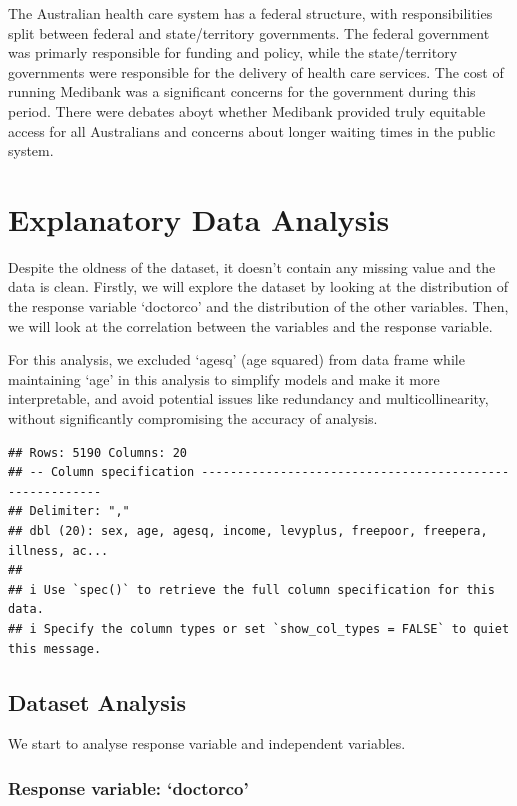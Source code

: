 \documentclass[
]{article}
\begin{document}
The Australian health care system has a federal structure, with
responsibilities split between federal and state/territory governments.
The federal government was primarly responsible for funding and policy,
while the state/territory governments were responsible for the delivery
of health care services. The cost of running Medibank was a significant
concerns for the government during this period. There were debates aboyt
whether Medibank provided truly equitable access for all Australians and
concerns about longer waiting times in the public system.

\section{Explanatory Data Analysis}\label{explanatory-data-analysis}

Despite the oldness of the dataset, it doesn't contain any missing value
and the data is clean. Firstly, we will explore the dataset by looking
at the distribution of the response variable `doctorco' and the
distribution of the other variables. Then, we will look at the
correlation between the variables and the response variable.

For this analysis, we excluded `agesq' (age squared) from data frame
while maintaining `age' in this analysis to simplify models and make it
more interpretable, and avoid potential issues like redundancy and
multicollinearity, without significantly compromising the accuracy of
analysis.

\begin{verbatim}
## Rows: 5190 Columns: 20
## -- Column specification --------------------------------------------------------
## Delimiter: ","
## dbl (20): sex, age, agesq, income, levyplus, freepoor, freepera, illness, ac...
## 
## i Use `spec()` to retrieve the full column specification for this data.
## i Specify the column types or set `show_col_types = FALSE` to quiet this message.
\end{verbatim}

\subsection{Dataset Analysis}\label{dataset-analysis}

We start to analyse response variable and independent variables.

\subsubsection{Response variable:
`doctorco'}\label{response-variable-doctorco}
\end{document}
